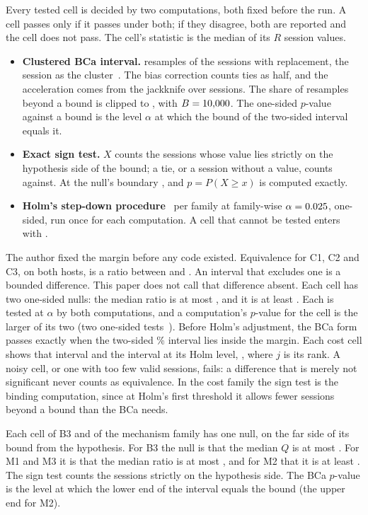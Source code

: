Every tested cell is decided by two computations, both fixed before the run. A cell passes only if
it passes under both; if they disagree, both are reported and the cell does not pass. The cell's
statistic is the median of its $R$ session values.
\begin{itemize}
\item \textbf{Clustered BCa interval.} \BootResamples{} resamples of the sessions with replacement,
the session as the cluster~\cite{efron1987bca,efron1993bootstrap}. The bias correction counts ties
as half, and the acceleration comes from the jackknife over sessions. The share of resamples beyond
a bound is clipped to \ClipRange, with $B = 10{,}000$. The one-sided $p$-value against a
bound is the level $\alpha$ at which the bound of the two-sided \IntervalLevel{} interval equals
it.
\item \textbf{Exact sign test.} $X$ counts the sessions whose value lies strictly on the
hypothesis side of the bound; a tie, or a session without a value, counts against. At the null's
boundary \SignNull, and $p = P(X \ge x)$ is computed exactly.
\item \textbf{Holm's step-down procedure}~\cite{holm1979simple} per family at family-wise $\alpha = 0.025$,
one-sided, run once for each computation. A cell that cannot be tested enters with \PIsOne{}.
\end{itemize}

 The author fixed the margin before any code existed.
Equivalence for C1, C2 and C3, on both hosts, is a ratio between \MarginLow{} and \MarginHigh.
An interval that excludes one is a bounded difference. This paper does not call that difference absent. Each cell has two one-sided nulls: the median ratio
is at most \MarginLow, and it is at least \MarginHigh. Each is tested at $\alpha$ by both
computations, and a computation's $p$-value for the cell is the larger of its two (two one-sided
tests~\cite{schuirmann1987tost}). Before Holm's adjustment, the BCa form passes exactly when the
two-sided \CiPct\% interval lies inside the margin. Each cost cell shows that interval and the
interval at its Holm level, \HolmLevel, where $j$ is its rank. A noisy cell, or one with too few
valid sessions, fails: a difference that is merely not significant never counts as equivalence.
In the cost family the sign test is the binding computation, since at Holm's first threshold it
allows fewer sessions beyond a bound than the BCa needs.

 Each cell of B3 and of the mechanism family has one null, on the far side of
its bound from the hypothesis. For B3 the null is that the median $Q$ is at most
\FootprintMargin. For M1 and M3 it is that the median ratio is at most \MechBound, and for M2 that
it is at least \MechBound. The sign test counts
the sessions strictly on the hypothesis side. The BCa $p$-value is the level at which the lower
end of the interval equals the bound (the upper end for M2).

